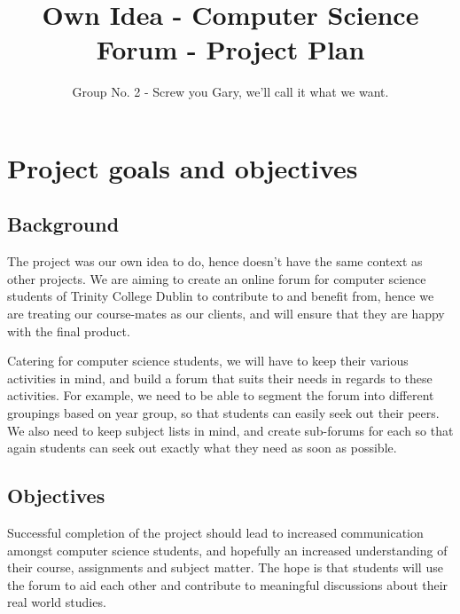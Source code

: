 \documentclass[a4paper, 12pt]{article}
\begin{document}
	\title{Own Idea - Computer Science Forum - Project Plan}
	\author{Group No. 2 - Screw you Gary, we'll call it what we want.}
	\maketitle
	\section{Project goals and objectives}
		\subsection{Background}
			\par The project was our own idea to do, hence doesn’t have the same context as other 
			projects. We are aiming to create an online forum for computer science students 
			of Trinity College Dublin to contribute to and benefit from, hence 
			we are treating our course-mates as our clients, and will ensure that they are happy with the final product. 

			\par Catering for computer science students, we will have to keep their various activities in mind, and
			 build a forum that suits their needs in regards to these activities. 
			For example, we need to be able to segment the forum into different 
			groupings based on year group, so that students can easily seek out 
			their peers. We also need to keep subject lists in mind, and 
			create sub-forums for each so that again students can seek out exactly what they need as soon as possible.
		\subsection{Objectives}
			\par Successful completion of the project should lead to increased communication amongst computer 
			science students, and hopefully an increased understanding of their course, 
			assignments and subject matter. The hope is that students will use the forum 
			to aid each other and contribute to meaningful discussions about their real world studies.

		\newpage
\end{document}
